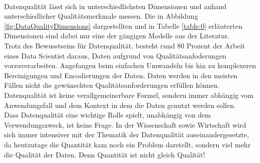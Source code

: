 \begin{onehalfspace}
\begin{table}[h]
            \caption{Data Quality Dimensions Merkmale}
            \label{table:0}
        \end{table}
        \\
        Datenqualität lässt sich in unterschiedlichsten Dimensionen und anhand unterschiedlicher Qualitätsmerkmale messen. Die in Abbildung \ref*{fig:DataQualityDimensions} dargestellten und in Tabelle \ref*{table:0} erläuterten Dimensionen sind dabei nur eine der gängigen Modelle aus der Literatur. 
        \\
        Trotz des Bewusstseins für Datenqualität, besteht rund 80 Prozent der Arbeit eines Data Scientist daraus, Daten aufgrund von Qualitätsanfoderungen vorzuverarbeiten.\cite{Horn2022} Angefangen beim einfachen Umwandeln bis hin zu komplexeren Bereinigungen und Encodierungen der Daten. Daten werden in den meisten Fällen nicht die gewünschten Qualitätsanforderungen erfüllen können. Datenqualität ist keine verallgemeinerbare Formel, sondern immer abhängig vom Anwendungsfall und dem Kontext in dem die Daten genutzt werden sollen.
        \\
        Dass Datenqualität eine wichtige Rolle spielt, unabhängig von dem Verwendungszweck, ist keine Frage. In der Wissenschaft sowie Wirtschaft wird sich immer intensiver mit der Thematik der Datenqualität auseinandergesetzte, da heutzutage die Quantität kam noch ein Problem darstellt, sondern viel mehr die Qualität der Daten.\cite{Lis2019} Denn Quantität ist nicht gleich Qualität!



\end{onehalfspace}
